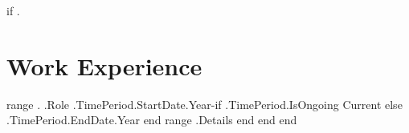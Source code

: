 {{if .}}
\section{Work Experience}
    \resumeSubHeadingListStart
    {{range .}}
    { {{.Role}} }{ {{.TimePeriod.StartDate.Year}}-{{if .TimePeriod.IsOngoing}} Current {{else}} {{.TimePeriod.EndDate.Year}} {{end}} }
            \resumeItemListStart
            {{range .Details}} 
            {{end}}
            \resumeItemListEnd
      {{end}}
      \resumeSubHeadingListEnd
\vspace{-16pt}
{{end}}